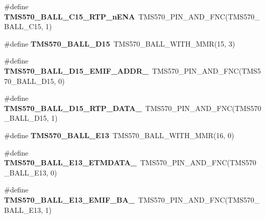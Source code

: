 \begin{DoxyCompactItemize}
\item 
\mbox{\label{tms570ls3137zwt-pins_8h_ac6518af08529ec983251367b8fb5799b}} 
\#define {\bfseries T\+M\+S570\+\_\+\+B\+A\+L\+L\+\_\+\+C15\+\_\+\+R\+T\+P\+\_\+n\+E\+NA}~T\+M\+S570\+\_\+\+P\+I\+N\+\_\+\+A\+N\+D\+\_\+\+F\+NC(T\+M\+S570\+\_\+\+B\+A\+L\+L\+\_\+\+C15, 1)
\item 
\mbox{\label{tms570ls3137zwt-pins_8h_ac156db301039beb2b24f9e1f396636c7}} 
\#define {\bfseries T\+M\+S570\+\_\+\+B\+A\+L\+L\+\_\+\+D15}~T\+M\+S570\+\_\+\+B\+A\+L\+L\+\_\+\+W\+I\+T\+H\+\_\+\+M\+MR(15, 3)
\item 
\mbox{\label{tms570ls3137zwt-pins_8h_a0840336fb3d7e47d2c128ccab7c8d997}} 
\#define {\bfseries T\+M\+S570\+\_\+\+B\+A\+L\+L\+\_\+\+D15\+\_\+\+E\+M\+I\+F\+\_\+\+A\+D\+D\+R\+\_}~T\+M\+S570\+\_\+\+P\+I\+N\+\_\+\+A\+N\+D\+\_\+\+F\+NC(T\+M\+S570\+\_\+\+B\+A\+L\+L\+\_\+\+D15, 0)
\item 
\mbox{\label{tms570ls3137zwt-pins_8h_ae11ecc285bbd23c3f2882fa477479c1d}} 
\#define {\bfseries T\+M\+S570\+\_\+\+B\+A\+L\+L\+\_\+\+D15\+\_\+\+R\+T\+P\+\_\+\+D\+A\+T\+A\+\_}~T\+M\+S570\+\_\+\+P\+I\+N\+\_\+\+A\+N\+D\+\_\+\+F\+NC(T\+M\+S570\+\_\+\+B\+A\+L\+L\+\_\+\+D15, 1)
\item 
\mbox{\label{tms570ls3137zwt-pins_8h_a582eb1953422f5281124524910be26e7}} 
\#define {\bfseries T\+M\+S570\+\_\+\+B\+A\+L\+L\+\_\+\+E13}~T\+M\+S570\+\_\+\+B\+A\+L\+L\+\_\+\+W\+I\+T\+H\+\_\+\+M\+MR(16, 0)
\item 
\mbox{\label{tms570ls3137zwt-pins_8h_a35750f29473cc9d99d5b71d0d3e79c9e}} 
\#define {\bfseries T\+M\+S570\+\_\+\+B\+A\+L\+L\+\_\+\+E13\+\_\+\+E\+T\+M\+D\+A\+T\+A\+\_}~T\+M\+S570\+\_\+\+P\+I\+N\+\_\+\+A\+N\+D\+\_\+\+F\+NC(T\+M\+S570\+\_\+\+B\+A\+L\+L\+\_\+\+E13, 0)
\item 
\mbox{\label{tms570ls3137zwt-pins_8h_a72c72c7b09a265ce5d33c7c37f4874a4}} 
\#define {\bfseries T\+M\+S570\+\_\+\+B\+A\+L\+L\+\_\+\+E13\+\_\+\+E\+M\+I\+F\+\_\+\+B\+A\+\_}~T\+M\+S570\+\_\+\+P\+I\+N\+\_\+\+A\+N\+D\+\_\+\+F\+NC(T\+M\+S570\+\_\+\+B\+A\+L\+L\+\_\+\+E13, 1)
\item 

\end{DoxyCompactItemize}
